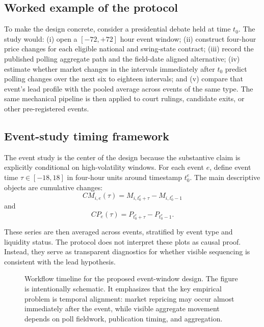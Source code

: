 \documentclass[11pt]{article}
\begin{document}
\subsection{Worked example of the protocol}
To make the design concrete, consider a presidential debate held at time $t_0$. The study would: (i) open a $[-72,+72]$ hour event window; (ii) construct four-hour price changes for each eligible national and swing-state contract; (iii) record the published polling aggregate path and the field-date aligned alternative; (iv) estimate whether market changes in the intervals immediately after $t_0$ predict polling changes over the next six to eighteen intervals; and (v) compare that event's lead profile with the pooled average across events of the same type. The same mechanical pipeline is then applied to court rulings, candidate exits, or other pre-registered events.

\subsection{Event-study timing framework}
The event study is the center of the design because the substantive claim is explicitly conditional on high-volatility windows. For each event $e$, define event time $\tau \in [-18,18]$ in four-hour units around timestamp $t_0^e$. The main descriptive objects are cumulative changes:
\[
CM_{i,e}(\tau) = M_{i,t_0^e+\tau} - M_{i,t_0^e-1}
\]
and
\[
CP_{e}(\tau) = P_{t_0^e+\tau} - P_{t_0^e-1}.
\]

These series are then averaged across events, stratified by event type and liquidity status. The protocol does not interpret these plots as causal proof. Instead, they serve as transparent diagnostics for whether visible sequencing is consistent with the lead hypothesis.

\begin{figure}[t]
\centering
{}
\caption{Workflow timeline for the proposed event-window design. The figure is intentionally schematic. It emphasizes that the key empirical problem is temporal alignment: market repricing may occur almost immediately after the event, while visible aggregate movement depends on poll fieldwork, publication timing, and aggregation.}
\end{figure}
\end{document}
